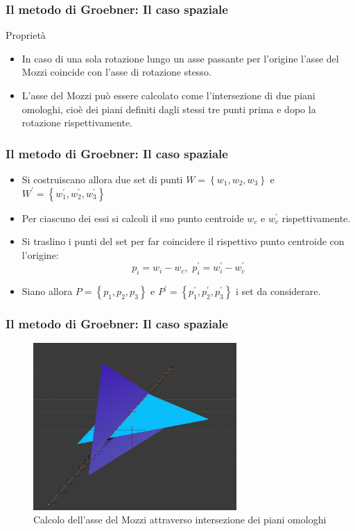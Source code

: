\documentclass{beamer}
\begin{document}
\begin{frame}
\frametitle{Il metodo di Groebner: Il caso spaziale}
\begin{block}{Proprietà}
	\begin{itemize}
		\item In caso di una sola rotazione lungo un asse passante per l'origine l'asse del Mozzi coincide con l'asse di rotazione stesso.
		
		\item L'asse del Mozzi può essere calcolato come l'intersezione di due piani omologhi, cioè dei piani definiti dagli stessi tre punti prima e dopo la rotazione rispettivamente.
	\end{itemize}
\end{block}
\end{frame}

\begin{frame}
\frametitle{Il metodo di Groebner: Il caso spaziale}
\begin{itemize}
	\item Si costruiscano allora due set di punti $W = \left\lbrace w_1, w_2, w_3 \right\rbrace$ e $W^{'} = \left\lbrace w_1^{'}, w_2^{'}, w_3^{'} \right\rbrace$
	
	\item Per ciascuno dei essi si calcoli il suo punto centroide $w_c$ e $w_c^{'}$ rispettivamente.
	
	\item Si traslino i punti del set per far coincidere il rispettivo punto centroide con l'origine:
	\begin{equation}
	p_i = w_i - w_c, \, \, 
	p_i^{'} = w_i^{'} - w_c^{'}
	\end{equation}
	\item Siano allora $P = \left\lbrace p_1, p_2, p_3 \right\rbrace$ e $P^{'} = \left\lbrace p_1^{'}, p_2^{'}, p_3^{'} \right\rbrace$ i set da considerare.
\end{itemize}
\end{frame}

\begin{frame}
	\frametitle{Il metodo di Groebner: Il caso spaziale}
	
	\begin{figure}[h]
		\centering
		\includegraphics[width=220pt]{imgs/AsseMozzi.jpg}
		\caption{Calcolo dell'asse del Mozzi attraverso intersezione dei piani omologhi}
		\label{rot:gb:imgMozzi}
	\end{figure} 
\end{frame}
\end{document}
